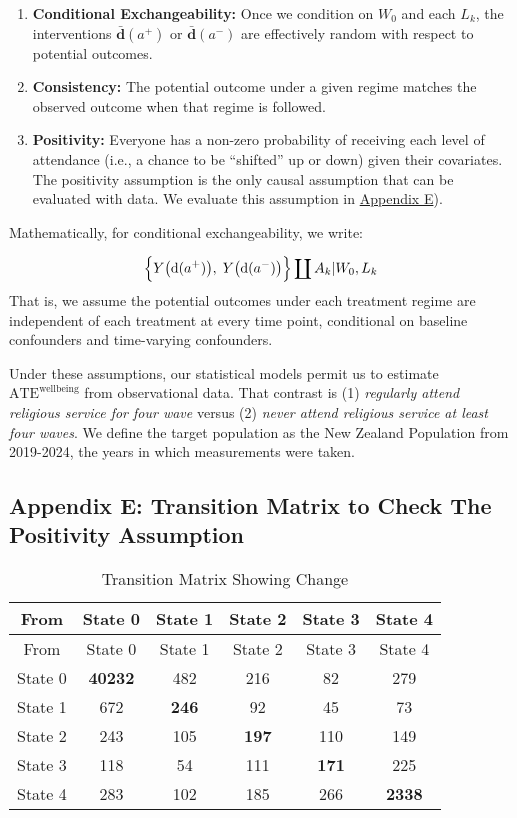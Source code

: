 \documentclass[
  single column]{article}
\providecommand{\tightlist}{%
  \setlength{\itemsep}{0pt}\setlength{\parskip}{0pt}}\usepackage{longtable,booktabs,array}
\begin{document}
\begin{enumerate}
\def\labelenumi{\arabic{enumi}.}
\tightlist
\item
  \textbf{Conditional Exchangeability:} Once we condition on \(W_0\) and
  each \(L_k\), the interventions
  \(\boldsymbol{\bar{\boldsymbol{\text{d}}}}(a^+)\) or
  \(\boldsymbol{\bar{\boldsymbol{\text{d}}}}(a^-)\) are effectively
  random with respect to potential outcomes.
\item
  \textbf{Consistency:} The potential outcome under a given regime
  matches the observed outcome when that regime is followed.
\item
  \textbf{Positivity:} Everyone has a non-zero probability of receiving
  each level of attendance (i.e., a chance to be ``shifted'' up or down)
  given their covariates. The positivity assumption is the only causal
  assumption that can be evaluated with data. We evaluate this
  assumption in \hyperref[appendix-transition]{Appendix E}).
\end{enumerate}

Mathematically, for conditional exchangeability, we write:

\[
\Bigl\{
  Y\bigl(\boldsymbol{\text{d}}(a^+)\bigr), 
  \; 
  Y\bigl(\boldsymbol{\text{d}}(a^-)\bigr)
\Bigr\}
\coprod
A_k |
W_0,
L_k
\] That is, we assume the potential outcomes under each treatment regime
are independent of each treatment at every time point, conditional on
baseline confounders and time-varying confounders.

Under these assumptions, our statistical models permit us to estimate
\(\text{ATE}^{\text{wellbeing}}\) from observational data. That contrast
is (1) \emph{regularly attend religious service for four wave} versus
(2) \emph{never attend religious service at least four waves}. We define
the target population as the New Zealand Population from 2019-2024, the
years in which measurements were taken.

\newpage{}

\subsection{Appendix E: Transition Matrix to Check The Positivity
Assumption}\label{appendix-transition}

\begin{longtable}[]{@{}cccccc@{}}
\caption{Transition Matrix Showing
Change}\label{tbl-transition}\tabularnewline
\toprule\noalign{}
From & State 0 & State 1 & State 2 & State 3 & State 4 \\
\midrule\noalign{}
\endfirsthead
\toprule\noalign{}
From & State 0 & State 1 & State 2 & State 3 & State 4 \\
\midrule\noalign{}
\endhead
\bottomrule\noalign{}
\endlastfoot
State 0 & \textbf{40232} & 482 & 216 & 82 & 279 \\
State 1 & 672 & \textbf{246} & 92 & 45 & 73 \\
State 2 & 243 & 105 & \textbf{197} & 110 & 149 \\
State 3 & 118 & 54 & 111 & \textbf{171} & 225 \\
State 4 & 283 & 102 & 185 & 266 & \textbf{2338} \\
\end{longtable}
\end{document}
